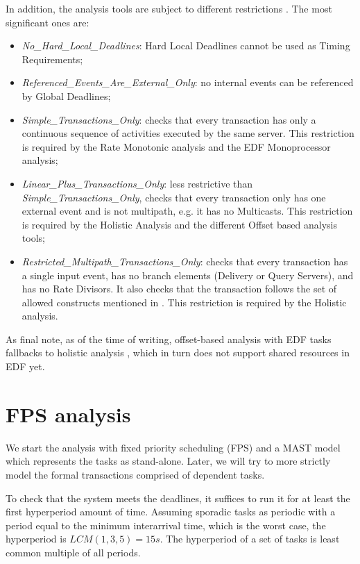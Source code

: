 \documentclass{article}
\begin{document}
In addition, the analysis tools are subject to different restrictions \cite{mast-restrictions}. The most significant ones are:

\begin{itemize}
   \item \textit{No\_Hard\_Local\_Deadlines}: Hard Local Deadlines cannot be used as Timing Requirements;
   \item \textit{Referenced\_Events\_Are\_External\_Only}: no internal events can be referenced by Global Deadlines;
   \item \textit{Simple\_Transactions\_Only}: checks that every transaction has only a continuous sequence of activities executed by the same server. This restriction is required by the Rate Monotonic analysis and the EDF Monoprocessor analysis;
   \item \textit{Linear\_Plus\_Transactions\_Only}: less restrictive than \textit{Simple\_Transactions\_Only}, checks that every transaction only has one external event and is not multipath, e.g. it has no Multicasts. This restriction is required by the Holistic Analysis and the different Offset based analysis tools;
   \item \textit{Restricted\_Multipath\_Transactions\_Only}: checks that every transaction has a single input event, has no branch elements (Delivery or Query Servers), and has no Rate Divisors. It also checks that the transaction follows the set of allowed constructs mentioned in \cite{mast-restrictions}. This restriction is required by the Holistic analysis.
\end{itemize}

As final note, as of the time of writing, offset-based analysis with EDF tasks fallbacks to holistic analysis \cite{mast-analysis}, which in turn does not support shared resources in EDF yet.

\section{FPS analysis}

We start the analysis with fixed priority scheduling (FPS) and a MAST model which represents the tasks as stand-alone. Later, we will try to more strictly model the formal transactions comprised of dependent tasks.

To check that the system meets the deadlines, it suffices to run it for at least the first hyperperiod amount of time. Assuming sporadic tasks as periodic with a period equal to the minimum interarrival time, which is the worst case, the hyperperiod is $LCM(1, 3, 5) = 15s$. The hyperperiod of a set of tasks is least common multiple of all periods.
\end{document}
